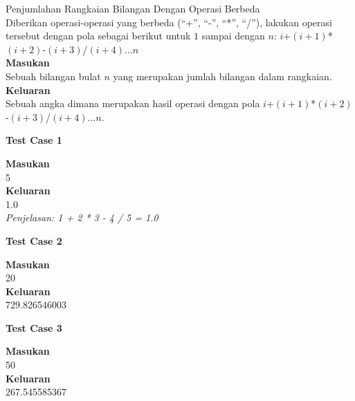 \newpage
\begin{permasalahan}{Penjumlahan Rangkaian Bilangan Dengan Operasi Berbeda}\\
	 Diberikan operasi-operasi yang berbeda (``+'', ``-'', ``*'', ``/''), lakukan operasi tersebut dengan pola sebagai berikut untuk $1$ sampai dengan $n$: $i$+$(i+1)$*$(i+2)$-$(i+3)$/$(i+4)$...$n$\\
	\textbf{Masukan}\\
	Sebuah bilangan  bulat $n$ yang merupakan jumlah bilangan dalam rangkaian.\\
	\textbf{Keluaran}\\
	Sebuah angka dimana merupakan hasil operasi dengan pola $i$+$(i+1)$*$(i+2)$-$(i+3)$/$(i+4)$...$n$.\\
	\begin{center}
	\textbf{Test Case 1}\\
	\end{center}
	\textbf{Masukan}\\
	5\\
	\textbf{Keluaran}\\
	1.0\\
	\textit{Penjelasan: 1 + 2 * 3 - 4 / 5 = 1.0}\\
	\begin{center}
	\textbf{Test Case 2}\\
	\end{center}
	\textbf{Masukan}\\
	20\\
	\textbf{Keluaran}\\
	729.826546003\\
	\begin{center}
	\textbf{Test Case 3}\\
	\end{center}
	\textbf{Masukan}\\
	50\\
	\textbf{Keluaran}\\
	267.545585367\\
\end{permasalahan}
